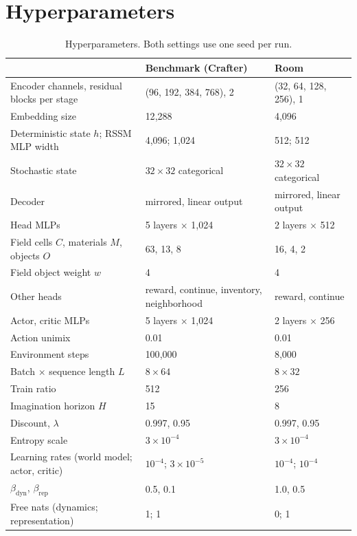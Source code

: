 \section{Hyperparameters}
\label{app:hyper}

\begin{table}[h]
  \centering
  \caption{Hyperparameters. Both settings use one seed per run.}
  \label{tab:hyper}
  \small
  \begin{tabular}{l l l}
    \toprule
    & Benchmark (Crafter) & Room \\
    \midrule
    Encoder channels, residual blocks per stage & (96, 192, 384, 768), 2 & (32, 64, 128, 256), 1 \\
    Embedding size & 12{,}288 & 4{,}096 \\
    Deterministic state $h$; RSSM MLP width & 4{,}096; 1{,}024 & 512; 512 \\
    Stochastic state & $32\times32$ categorical & $32\times32$ categorical \\
    Decoder & mirrored, linear output & mirrored, linear output \\
    Head MLPs & 5 layers $\times$ 1{,}024 & 2 layers $\times$ 512 \\
    Field cells $C$, materials $M$, objects $O$ & 63, 13, 8 & 16, 4, 2 \\
    Field object weight $w$ & 4 & 4 \\
    Other heads & reward, continue, inventory, neighborhood & reward, continue \\
    Actor, critic MLPs & 5 layers $\times$ 1{,}024 & 2 layers $\times$ 256 \\
    Action unimix & 0.01 & 0.01 \\
    \midrule
    Environment steps & 100{,}000 & 8{,}000 \\
    Batch $\times$ sequence length $L$ & $8\times64$ & $8\times32$ \\
    Train ratio & 512 & 256 \\
    Imagination horizon $H$ & 15 & 8 \\
    Discount, $\lambda$ & 0.997, 0.95 & 0.997, 0.95 \\
    Entropy scale & $3\times10^{-4}$ & $3\times10^{-4}$ \\
    Learning rates (world model; actor, critic) & $10^{-4}$; $3\times10^{-5}$ & $10^{-4}$; $10^{-4}$ \\
    $\beta_{\mathrm{dyn}}$, $\beta_{\mathrm{rep}}$ & 0.5, 0.1 & 1.0, 0.5 \\
    Free nats (dynamics; representation) & 1; 1 & 0; 1 \\

\end{tabular}
\end{table}
